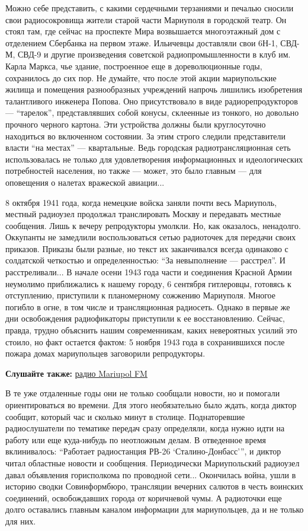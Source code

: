 Можно себе представить, с какими сердечными терзаниями и печалью сносили свои
радиосокровища жители старой части Мариуполя в городской театр. Он стоял там,
где сейчас на проспекте Мира возвышается многоэтажный дом с отделением
Сбербанка на первом этаже. Ильичевцы доставляли свои 6Н-1, СВД-М, СВД-9 и
другие произведения советской радиопромышленности в клуб им. Карла Маркса, чье
здание, построенное еще в дореволюционные годы, сохранилось до сих пор. Не
думайте, что после этой акции мариупольские жилища и помещения разнообразных
учреждений напрочь лишились изобретения талантливого инженера Попова. Оно
присутствовало в виде радиорепродукторов — \enquote{тарелок}, представлявших собой
конусы, склеенные из тонкого, но довольно прочного черного картона. Эти
устройства должны были круглосуточно находиться во включенном состоянии. За
этим строго следили представители власти \enquote{на местах} — квартальные. Ведь
городская радиотрансляционная сеть использовалась не только для удовлетворения
информационных и идеологических потребностей населения, но также — может, это
было главным — для оповещения о налетах вражеской авиации...

8 октября 1941 года, когда немецкие войска заняли почти весь Мариуполь, местный
радиоузел продолжал транслировать Москву и передавать местные сообщения. Лишь к
вечеру репродукторы умолкли. Но, как оказалось, ненадолго. Оккупанты не
замедлили воспользоваться сетью радиоточек для передачи своих приказов. Приказы
были разные, но текст их заканчивался всегда одинаково с солдатской четкостью и
определенностью: \enquote{За невыполнение — расстрел}. И расстреливали... В начале осени
1943 года части и соединения Красной Армии неумолимо приближались к нашему
городу, 6 сентября гитлеровцы, готовясь к отступлению, приступили к
планомерному сожжению Мариуполя. Многое погибло в огне, в том числе и
трансляционная радиосеть. Однако в первые же дни освобождения радиофикаторы
приступили к ее восстановлению. Сейчас, правда, трудно объяснить нашим
современникам, каких невероятных усилий это стоило, но факт остается фактом: 5
ноября 1943 года в сохранившихся после пожара домах мариупольцев заговорили
репродукторы.

\textbf{Слушайте также:} \href{https://mrpl.city/radio.html}{радио Mariupol FM}

В те уже отдаленные годы они не только сообщали новости, но и помогали
ориентироваться во времени. Для этого необязательно было ждать, когда диктор
сообщит, который час и сколько минут в столице. Поднаторевшие радиослушатели по
тематике передач сразу определяли, когда нужно идти на работу или еще
куда-нибудь по неотложным делам. В отведенное время вклинивалось: \enquote{Работает
радиостанция РВ-26 \enquote{Сталино-Донбасс}}, и диктор читал областные новости и
сообщения. Периодически Мариупольский радиоузел давал объявления горисполкома
по проводной сети... Окончилась война, ушли в историю сводки Совинформбюро,
трансляции вечерних салютов в честь воинских соединений, освобождавших города
от коричневой чумы. А радиоточки еще долго оставались главным каналом
информации для мариупольцев, да и не только для них.
